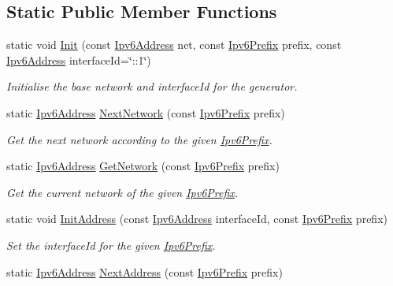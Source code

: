 \subsection*{Static Public Member Functions}
\begin{DoxyCompactItemize}
\item 
static void \hyperlink{classns3_1_1Ipv6AddressGenerator_a010449feb2e0aa103dd93abb44b6f423}{Init} (const \hyperlink{classns3_1_1Ipv6Address}{Ipv6\+Address} net, const \hyperlink{classns3_1_1Ipv6Prefix}{Ipv6\+Prefix} prefix, const \hyperlink{classns3_1_1Ipv6Address}{Ipv6\+Address} interface\+Id=\char`\"{}\+::1\char`\"{})
\begin{DoxyCompactList}\small\item\em Initialise the base network and interface\+Id for the generator. \end{DoxyCompactList}\item 
static \hyperlink{classns3_1_1Ipv6Address}{Ipv6\+Address} \hyperlink{classns3_1_1Ipv6AddressGenerator_ad3d156d50f45026dd896e121ae04d24b}{Next\+Network} (const \hyperlink{classns3_1_1Ipv6Prefix}{Ipv6\+Prefix} prefix)
\begin{DoxyCompactList}\small\item\em Get the next network according to the given \hyperlink{classns3_1_1Ipv6Prefix}{Ipv6\+Prefix}. \end{DoxyCompactList}\item 
static \hyperlink{classns3_1_1Ipv6Address}{Ipv6\+Address} \hyperlink{classns3_1_1Ipv6AddressGenerator_a3d153f59d37c8012186db6a18db5681c}{Get\+Network} (const \hyperlink{classns3_1_1Ipv6Prefix}{Ipv6\+Prefix} prefix)
\begin{DoxyCompactList}\small\item\em Get the current network of the given \hyperlink{classns3_1_1Ipv6Prefix}{Ipv6\+Prefix}. \end{DoxyCompactList}\item 
static void \hyperlink{classns3_1_1Ipv6AddressGenerator_a73d9540591ca4aa1ead41d8463d7784f}{Init\+Address} (const \hyperlink{classns3_1_1Ipv6Address}{Ipv6\+Address} interface\+Id, const \hyperlink{classns3_1_1Ipv6Prefix}{Ipv6\+Prefix} prefix)
\begin{DoxyCompactList}\small\item\em Set the interface\+Id for the given \hyperlink{classns3_1_1Ipv6Prefix}{Ipv6\+Prefix}. \end{DoxyCompactList}\item 
static \hyperlink{classns3_1_1Ipv6Address}{Ipv6\+Address} \hyperlink{classns3_1_1Ipv6AddressGenerator_a1d470e21bf48dd0dc39fb3c12414218e}{Next\+Address} (const \hyperlink{classns3_1_1Ipv6Prefix}{Ipv6\+Prefix} prefix)

\end{DoxyCompactItemize}
